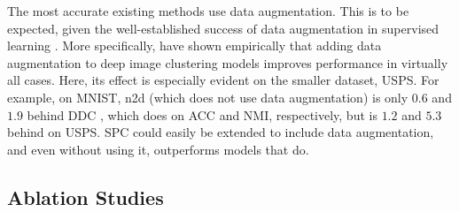 \documentclass[runningheads]{llncs}
\begin{document}
The most accurate existing methods use data augmentation. This is to be expected, given the well-established success of data augmentation in supervised learning \cite{hinton2012improving}. More specifically, \cite{guo2018deep} have shown empirically that adding data augmentation to deep image clustering models improves performance in virtually all cases. Here, its effect is especially evident on the smaller dataset, USPS. For example, on MNIST, n2d \cite{mcconville2019n2d} (which does not use data augmentation) is only $0.6$ and $1.9$ behind DDC \cite{ren2020deep}, which does on ACC and NMI, respectively, but is $1.2$ and $5.3$ behind on USPS. SPC could easily be extended to include data augmentation, and even without using it, outperforms models that do.


\subsection{Ablation Studies}
\end{document}
